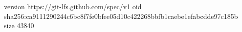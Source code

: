 version https://git-lfs.github.com/spec/v1
oid sha256:ca9111290244c6bc8f7fe0bfee05d10c422268bbfb1caebe1efabcdde97c185b
size 43840
